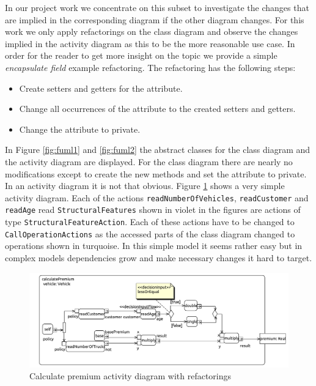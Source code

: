 \documentclass{llncs}
\begin{document}
In our project work we concentrate on this subset to investigate the changes that are implied in the corresponding diagram if the other diagram changes. For this work we only apply refactorings on the class diagram and observe the changes implied in the activity diagram as this to be the more reasonable use case. In order for the reader to get more insight on the topic we provide a simple \textit{encapsulate field} example refactoring. The refactoring has the following steps:

\begin{itemize}
 \item Create setters and getters for the attribute.
 \item Change all occurrences of the attribute to the created setters and getters.
 \item Change the attribute to private.
\end{itemize}

In Figure \ref{fig:fuml1} and \ref{fig:fuml2} the abstract classes for the class diagram and the activity diagram are displayed. For the class diagram there are nearly no modifications except to create the new methods and set the attribute to private. In an activity diagram it is not that obvious. Figure \ref{fig:calculatePremiumRef} shows a very simple activity diagram. Each of the actions \lstinline|readNumberOfVehicles|, \lstinline|readCustomer| and \lstinline|readAge| read \lstinline|StructuralFeatures| shown in violet in the figures are actions of type \lstinline|StructuralFeatureAction|. Each of these actions have to be changed to \lstinline|CallOperationActions| as the accessed parts of the class diagram changed to operations shown in turquoise. In this simple model it seems rather easy but in complex models dependencies grow and make necessary changes it hard to target.

\begin{figure}[h!t]
 \centering
 \includegraphics[scale=0.5]{images/insurance_ref/Activity_calculatePremium_calculatePremium}
 \caption{Calculate premium activity diagram with refactorings}
 \label{fig:calculatePremiumRef}
\end{figure}
\end{document}
